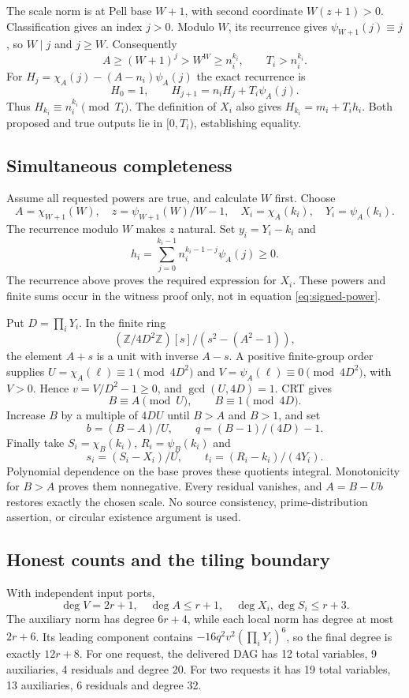 The scale norm is at Pell base $W+1$, with second coordinate $W(z+1)>0$.
Classification gives an index $j>0$. Modulo $W$, its recurrence gives
$\psi_{W+1}(j)\equiv j$, so $W\mid j$ and $j\geq W$. Consequently
\[
A\geq(W+1)^j>W^W\geq n_i^{k_i},\qquad T_i>n_i^{k_i}.
\]
For $H_j=\chi_A(j)-(A-n_i)\psi_A(j)$ the exact recurrence is
\[
H_0=1,\qquad H_{j+1}=n_iH_j+T_i\psi_A(j).
\]
Thus $H_{k_i}\equiv n_i^{k_i}\pmod{T_i}$. The definition of $X_i$ also
gives $H_{k_i}=m_i+T_i h_i$. Both proposed and true outputs lie in
$[0,T_i)$, establishing equality.

\subsection{Simultaneous completeness}
Assume all requested powers are true, and calculate $W$ first. Choose
\[
A=\chi_{W+1}(W),\quad z=\psi_{W+1}(W)/W-1,
\quad X_i=\chi_A(k_i),\quad Y_i=\psi_A(k_i).
\]
The recurrence modulo $W$ makes $z$ natural. Set $y_i=Y_i-k_i$ and
\[
h_i=\sum_{j=0}^{k_i-1}n_i^{k_i-1-j}\psi_A(j)\geq0.
\]
The recurrence above proves the required expression for $X_i$. These powers
and finite sums occur in the witness proof only, not in equation
\eqref{eq:signed-power}.

Put $D=\prod_iY_i$. In the finite ring
\[
(\mathbb Z/4D^2\mathbb Z)[s]/(s^2-(A^2-1)),
\]
the element $A+s$ is a unit with inverse $A-s$. A positive finite-group
order supplies $U=\chi_A(\ell)\equiv1\pmod{4D^2}$ and
$V=\psi_A(\ell)\equiv0\pmod{4D^2}$, with $V>0$. Hence
$v=V/D^2-1\geq0$, and $\gcd(U,4D)=1$. CRT gives
\[
B\equiv A\pmod U,\qquad B\equiv1\pmod{4D}.
\]
Increase $B$ by a multiple of $4DU$ until $B>A$ and $B>1$, and set
\[
b=(B-A)/U,\qquad q=(B-1)/(4D)-1.
\]
Finally take $S_i=\chi_B(k_i)$, $R_i=\psi_B(k_i)$ and
\[
s_i=(S_i-X_i)/U,\qquad t_i=(R_i-k_i)/(4Y_i).
\]
Polynomial dependence on the base proves these quotients integral.
Monotonicity for $B>A$ proves them nonnegative. Every residual vanishes,
and $A=B-Ub$ restores exactly the chosen scale. No source consistency,
prime-distribution assertion, or circular existence argument is used.

\subsection{Honest counts and the tiling boundary}
With independent input ports,
\[
\deg V=2r+1,\quad\deg A\leq r+1,\quad
\deg X_i,\deg S_i\leq r+3.
\]
The auxiliary norm has degree $6r+4$, while each local norm has degree at
most $2r+6$. Its leading component contains
$-16q^2v^2(\prod_iY_i)^6$, so the final degree is exactly $12r+8$.
For one request, the delivered DAG has 12 total variables, 9 auxiliaries,
4 residuals and degree 20. For two requests it has 19 total variables,
13 auxiliaries, 6 residuals and degree 32.

